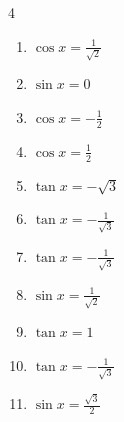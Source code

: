 \begin{multicols}{4}
\begin{enumerate}
  \item $\displaystyle \cos{x}  = \frac{1}{\sqrt{2}}$


  \item $\displaystyle \sin{x}  = 0$

        \phantom{$\displaystyle x = 0 , \pi$}

  \item $\displaystyle \cos{x}  = -\frac{1}{2}$


\columnbreak %

  \item $\displaystyle \cos{x}  = \frac{1}{2}$


  \item $\displaystyle \tan{x}  = -\sqrt{3}$


  \item $\displaystyle \tan{x}  = -\frac{1}{\sqrt{3}}$


  \item $\displaystyle \tan{x}  = -\frac{1}{\sqrt{3}}$


  \item $\displaystyle \sin{x}  = \frac{1}{\sqrt{2}}$


  \item $\displaystyle \tan{x}  = 1$


  \item $\displaystyle \tan{x}  = -\frac{1}{\sqrt{3}}$


  \item $\displaystyle \sin{x}  = \frac{\sqrt{3}}{2}$



\end{enumerate}
\end{multicols}
